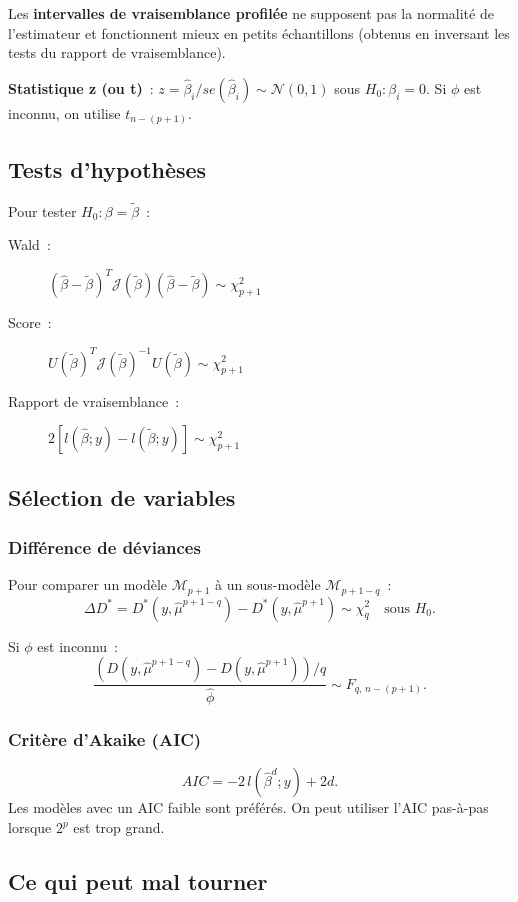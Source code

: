 \documentclass[11pt,letterpaper]{article}
\begin{document}
Les \textbf{intervalles de vraisemblance profilée} ne supposent pas la normalité de l'estimateur et fonctionnent mieux en petits échantillons (obtenus en inversant les tests du rapport de vraisemblance).

\textbf{Statistique z (ou t)}~: $z = \hat{\beta}_i / se(\hat{\beta}_i) \sim \mathcal{N}(0,1)$ sous $H_0: \beta_i = 0$. Si $\phi$ est inconnu, on utilise $t_{n-(p+1)}$.

\subsection{Tests d'hypothèses}

Pour tester $H_0: \beta = \tilde{\beta}$~:
\begin{description}
\item[Wald~:] $(\hat{\beta}-\tilde{\beta})^T \mathcal{J}(\tilde{\beta})(\hat{\beta}-\tilde{\beta}) \sim \chi^2_{p+1}$
\item[Score~:] $U(\tilde{\beta})^T \mathcal{J}(\tilde{\beta})^{-1} U(\tilde{\beta}) \sim \chi^2_{p+1}$
\item[Rapport de vraisemblance~:] $2[l(\hat{\beta};y) - l(\tilde{\beta};y)] \sim \chi^2_{p+1}$
\end{description}

\subsection{Sélection de variables}

\subsubsection{Différence de déviances}

Pour comparer un modèle $\mathcal{M}_{p+1}$ à un sous-modèle $\mathcal{M}_{p+1-q}$~:
$$\Delta D^* = D^*(y,\hat{\mu}^{p+1-q}) - D^*(y,\hat{\mu}^{p+1}) \sim \chi^2_q \quad \text{sous } H_0.$$

Si $\phi$ est inconnu~:
$$\frac{(D(y,\hat{\mu}^{p+1-q}) - D(y,\hat{\mu}^{p+1}))/q}{\hat{\phi}} \sim F_{q,\, n-(p+1)}.$$

\subsubsection{Critère d'Akaike (AIC)}
$$AIC = -2\,l(\hat{\beta}^d;y) + 2d.$$
Les modèles avec un AIC faible sont préférés. On peut utiliser l'AIC pas-à-pas lorsque $2^p$ est trop grand.

\subsection{Ce qui peut mal tourner}
\end{document}
